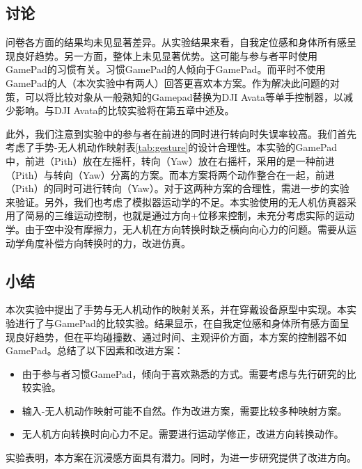 \subsection{讨论}

问卷各方面的结果均未见显著差异。从实验结果来看，自我定位感和身体所有感呈现良好趋势。另一方面，整体上未见显著优势。这可能与参与者平时使用GamePad的习惯有关。习惯GamePad的人倾向于GamePad。而平时不使用GamePad的人（本次实验中有两人）回答更喜欢本方案。作为解决此问题的对策，可以将比较对象从一般熟知的Gamepad替换为DJI Avata等单手控制器，以减少影响。与DJI Avata的比较实验将在第五章中述及。

此外，我们注意到实验中的参与者在前进的同时进行转向时失误率较高。我们首先考虑了手势-无人机动作映射表\ref{tab:gesture}的设计合理性。本实验的GamePad中，前进（Pith）放在左摇杆，转向（Yaw）放在右摇杆，采用的是一种前进（Pith）与转向（Yaw）分离的方案。而本方案将两个动作整合在一起，前进（Pith）的同时可进行转向（Yaw）。对于这两种方案的合理性，需进一步的实验来验证。另外，我们也考虑了模拟器运动学的不足。本实验使用的无人机仿真器采用了简易的三维运动控制，也就是通过方向+位移来控制，未充分考虑实际的运动学。由于空中没有摩擦力，无人机在方向转换时缺乏横向向心力的问题。需要从运动学角度补偿方向转换时的力，改进仿真。

\subsection{小结}

本次实验中提出了手势与无人机动作的映射关系，并在穿戴设备原型中实现。本实验进行了与GamePad的比较实验。结果显示，在自我定位感和身体所有感方面呈现良好趋势，但在平均碰撞数、通过时间、主观评价方面，本方案的控制器不如GamePad。总结了以下因素和改进方案：

\begin{itemize}
    \item 由于参与者习惯GamePad，倾向于喜欢熟悉的方式。需要考虑与先行研究的比较实验。
    \item 输入-无人机动作映射可能不自然。作为改进方案，需要比较多种映射方案。
    \item 无人机方向转换时向心力不足。需要进行运动学修正，改进方向转换动作。
\end{itemize}

实验表明，本方案在沉浸感方面具有潜力。同时，为进一步研究提供了改进方向。

\ifx\allfiles\undefined

\fi
